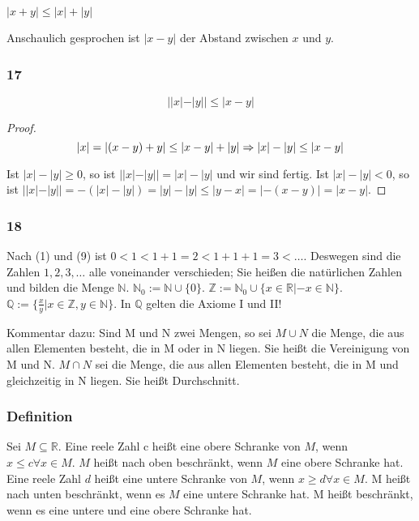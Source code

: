 \documentclass[a4paper,10pt]{article}
\begin{document}
$|x + y| \le |x| + |y|$

Anschaulich gesprochen ist $|x - y|$ der Abstand zwischen $x$ und $y$.

\subsubsection{17}

\begin{equation}
 ||x| - |y|| \le |x - y|
\end{equation}

\begin{proof}
 \begin{equation}
  |x| = |(x - y) + y| \le |x - y| + |y|\\
  \Rightarrow |x| - |y| \le |x - y|\\
 \end{equation}
 
 Ist $|x| - |y| \ge 0$, so ist $||x| - |y|| = |x| - |y|$ und wir sind fertig.
 Ist $|x| - |y| < 0$, so ist $||x| - |y|| = -(|x| - |y|) = |y| - |y| \le |y - x| = |-(x - y)| = |x - y|$.
\end{proof}

\subsubsection{18}

Nach (1) und (9) ist $0 < 1 < 1 + 1 = 2 < 1 + 1 + 1 = 3 < \dots$.
Deswegen sind die Zahlen $1, 2, 3, \dots$ alle voneinander verschieden; Sie heißen die natürlichen Zahlen und bilden die Menge $\mathbb{N}$.
$\mathbb{N}_0 := \mathbb{N} \cup \{0\}$.
$\mathbb{Z} := \mathbb{N}_0 \cup \{x \in \mathbb{R} | -x \in \mathbb{N}\}$.
$\mathbb{Q} := \{\frac{x}{y} | x \in \mathbb{Z}, y \in \mathbb{N} \}$.
In $\mathbb{Q}$ gelten die Axiome I und II!

Kommentar dazu: Sind M und N zwei Mengen, so sei $M \cup N$ die Menge, die aus allen Elementen besteht, die in M oder in N liegen.
Sie heißt die Vereinigung von M und N.
$M \cap N$ sei die Menge, die aus allen Elementen besteht, die in M und gleichzeitig in N liegen.
Sie heißt Durchschnitt.

\subsubsection{Definition}

Sei $M \subseteq \mathbb{R}$. Eine reele Zahl c heißt eine obere Schranke von $M$, wenn $x \le c \forall x \in M$.
$M$ heißt nach oben beschränkt, wenn $M$ eine obere Schranke hat.
Eine reele Zahl $d$ heißt eine untere Schranke von $M$, wenn $x \ge d \forall x \in M$.
M heißt nach unten beschränkt, wenn es $M$ eine untere Schranke hat.
M heißt beschränkt, wenn es eine untere und eine obere Schranke hat.
\end{document}

